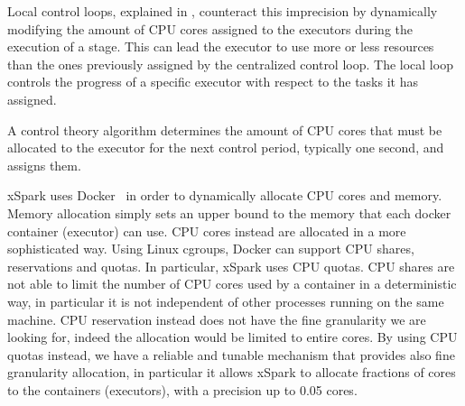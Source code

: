 Local control loops, explained in , counteract this imprecision
by dynamically modifying the amount of CPU cores assigned to the executors during the execution of a stage. This can lead the executor to use more or less resources than the ones previously
assigned by the centralized control loop. The local loop controls the progress of a specific executor with respect to the tasks it has assigned.

A control theory algorithm determines the amount of CPU cores that must be allocated to the executor for the next control period, typically one second, and assigns them.

xSpark uses Docker~\cite{misc:Docker} in order to dynamically allocate CPU cores and memory. Memory allocation simply sets an upper bound to the memory that each docker container (executor) can use. CPU cores instead are allocated in a more sophisticated way.
Using Linux cgroups, Docker can support CPU shares, reservations and quotas. In particular, xSpark uses CPU quotas. CPU shares are not able to limit the number of CPU cores used by a container in a deterministic way, in particular it is not independent of other processes
running on the same machine. CPU reservation instead does not have the fine granularity we are looking for, indeed the allocation would be limited to entire cores. By using CPU quotas instead, we have a reliable and tunable mechanism that provides also fine granularity
allocation, in particular it allows xSpark to allocate fractions of cores
to the containers (executors), with a precision up to 0.05 cores.
